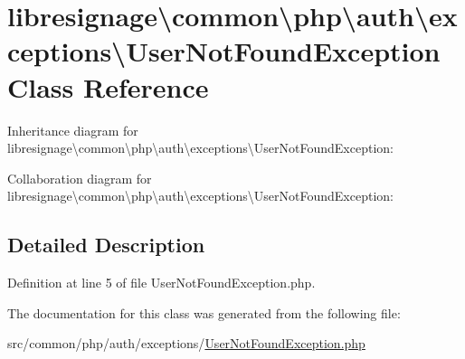 \hypertarget{classlibresignage_1_1common_1_1php_1_1auth_1_1exceptions_1_1UserNotFoundException}{}\section{libresignage\textbackslash{}common\textbackslash{}php\textbackslash{}auth\textbackslash{}exceptions\textbackslash{}User\+Not\+Found\+Exception Class Reference}
\label{classlibresignage_1_1common_1_1php_1_1auth_1_1exceptions_1_1UserNotFoundException}


Inheritance diagram for libresignage\textbackslash{}common\textbackslash{}php\textbackslash{}auth\textbackslash{}exceptions\textbackslash{}User\+Not\+Found\+Exception\+:


Collaboration diagram for libresignage\textbackslash{}common\textbackslash{}php\textbackslash{}auth\textbackslash{}exceptions\textbackslash{}User\+Not\+Found\+Exception\+:


\subsection{Detailed Description}


Definition at line 5 of file User\+Not\+Found\+Exception.\+php.



The documentation for this class was generated from the following file\+:\begin{DoxyCompactItemize}
\item 
src/common/php/auth/exceptions/\hyperlink{UserNotFoundException_8php}{User\+Not\+Found\+Exception.\+php}\end{DoxyCompactItemize}
